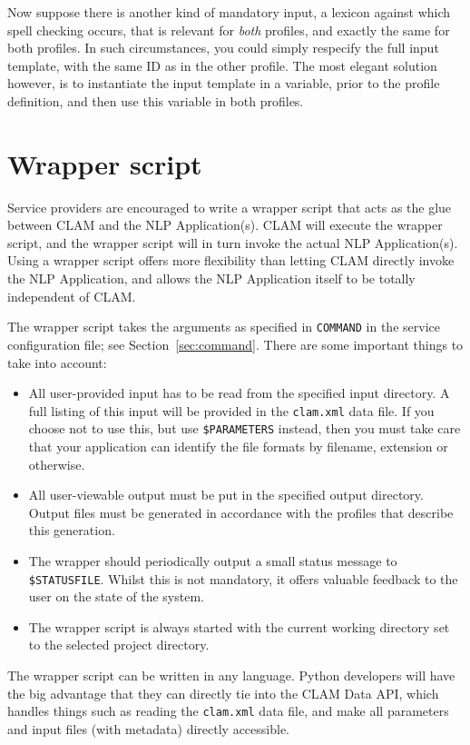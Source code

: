\documentclass[a4paper,12pt]{report}
\begin{document}
Now suppose there is another kind of mandatory input, a lexicon against which spell checking occurs, that is relevant for \emph{both} profiles, and exactly the same for both profiles. In such circumstances, you could simply respecify the full input template, with the same ID as in the other profile. The most elegant solution however, is to instantiate the input template in a variable, prior to the profile definition, and then use this variable in both profiles.


\section{Wrapper script}

Service providers are encouraged to write a wrapper script that acts as the glue between CLAM and the NLP Application(s). CLAM will execute the wrapper script, and the wrapper script will in turn invoke the actual NLP Application(s). Using a wrapper script offers more flexibility than letting CLAM directly invoke the NLP Application, and allows the NLP Application itself to be totally independent of CLAM. 

The wrapper script takes the arguments as specified in \texttt{COMMAND} in the service configuration file; see Section~\ref{sec:command}. There are some important things to take into account:

\begin{itemize}
\item All user-provided input has to be read from the specified input directory. A full listing of this input will be provided in the \texttt{clam.xml} data file. If you choose not to use this, but use \texttt{\$PARAMETERS} instead, then you must take care that your application can identify the file formats by filename, extension or otherwise.
\item All user-viewable output must be put in the specified output directory. Output files must be generated in accordance with the profiles that describe this generation. 
\item The wrapper should periodically output a small status message to \texttt{\$STATUSFILE}. Whilst this is not mandatory, it offers valuable feedback to the user on the state of the system. 
\item The wrapper script is always started with the current working directory set to the selected project directory.
\end{itemize}

The wrapper script can be written in any language. Python developers will have the big advantage that they can directly tie into the CLAM Data API, which handles things such as reading the \texttt{clam.xml} data file, and make all parameters and input files (with metadata) directly accessible.
\end{document}
